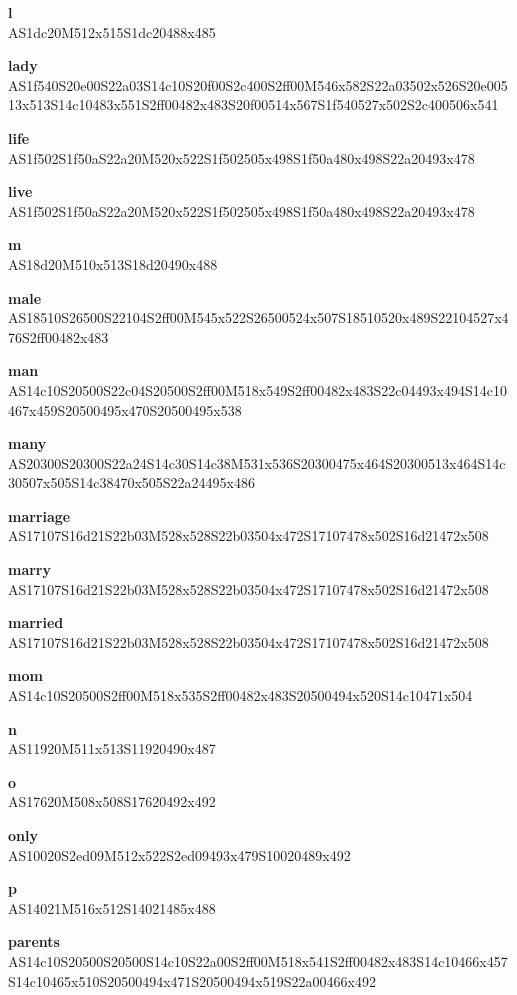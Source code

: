 \documentclass{article}
\begin{document}
\begin{glossary}
\textbf{l}\\
AS1dc20M512x515S1dc20488x485

\textbf{lady}\\
AS1f540S20e00S22a03S14c10S20f00S2c400S2ff00M546x582S22a03502x526S20e00513x513S14c10483x551S2ff00482x483S20f00514x567S1f540527x502S2c400506x541

\textbf{life}\\
AS1f502S1f50aS22a20M520x522S1f502505x498S1f50a480x498S22a20493x478

\textbf{live}\\
AS1f502S1f50aS22a20M520x522S1f502505x498S1f50a480x498S22a20493x478

\textbf{m}\\
AS18d20M510x513S18d20490x488

\textbf{male}\\
AS18510S26500S22104S2ff00M545x522S26500524x507S18510520x489S22104527x476S2ff00482x483

\textbf{man}\\
AS14c10S20500S22c04S20500S2ff00M518x549S2ff00482x483S22c04493x494S14c10467x459S20500495x470S20500495x538

\textbf{many}\\
AS20300S20300S22a24S14c30S14c38M531x536S20300475x464S20300513x464S14c30507x505S14c38470x505S22a24495x486

\textbf{marriage}\\
AS17107S16d21S22b03M528x528S22b03504x472S17107478x502S16d21472x508

\textbf{marry}\\
AS17107S16d21S22b03M528x528S22b03504x472S17107478x502S16d21472x508

\textbf{married}\\
AS17107S16d21S22b03M528x528S22b03504x472S17107478x502S16d21472x508

\textbf{mom}\\
AS14c10S20500S2ff00M518x535S2ff00482x483S20500494x520S14c10471x504

\textbf{n}\\
AS11920M511x513S11920490x487

\textbf{o}\\
AS17620M508x508S17620492x492

\textbf{only}\\
AS10020S2ed09M512x522S2ed09493x479S10020489x492

\textbf{p}\\
AS14021M516x512S14021485x488

\textbf{parents}\\
AS14c10S20500S20500S14c10S22a00S2ff00M518x541S2ff00482x483S14c10466x457S14c10465x510S20500494x471S20500494x519S22a00466x492


\end{glossary}
\end{document}
